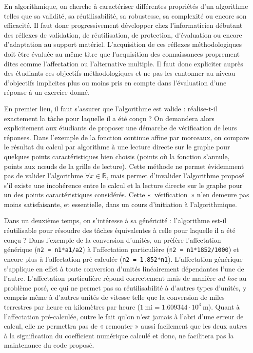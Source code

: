 \documentclass[11pt,a4paper,colorlinks,breaklinks]{article}
\begin{document}
En algorithmique, on cherche à caractériser différentes propriétés d'un algorithme telles que sa validité, sa réutilisabilité, sa robustesse, sa complexité ou encore son efficacité. Il faut donc progressivement développer chez l'informaticien débutant des réflexes de validation, de réutilisation, de protection, d'évaluation ou encore d'adaptation au support matériel. L'acquisition de ces réflexes méthodologiques doit être évaluée au même titre que l'acquisition des connaissances proprement dites comme l'affectation ou l'alternative multiple. Il faut donc expliciter auprès des étudiants ces objectifs méthodologiques et ne pas les cantonner au niveau d'objectifs implicites plus ou moins pris en compte dans l'évaluation d'une réponse à un exercice donné.

En premier lieu, il faut s'assurer que l'algorithme est valide : réalise-t-il exactement la tâche pour laquelle il a été conçu ? On demandera alors explicitement aux étudiants de proposer une démarche de vérification de leurs réponses. Dans l'exemple de la fonction continue affine par morceaux, on compare le résultat du calcul par algorithme à une lecture directe sur le graphe pour quelques points caractéristiques bien choisis (points où la fonction s'annule,  
points aux n\oe uds de la grille de lecture). Cette méthode ne permet évidemment
pas de valider l'algorithme $\forall x \in \mathbb{R}$, mais permet d'invalider
l'algorithme proposé s'il existe une incohérence entre le calcul et la lecture
directe sur le graphe pour un des points caractéristiques considérés.
Cette «~vérification~» n'en demeure pas moins satisfaisante, et essentielle, 
dans un cours d'initiation à l'algorithmique.

Dans un deuxième temps, on s'intéresse à sa généricité : l'algorithme est-il réutilisable pour résoudre des tâches équivalentes à celle pour laquelle il a été conçu ? Dans l'exemple de la conversion d'unités, on préfère l'affectation générique (\texttt{n2 = n1*a1/a2}) à l'affectation particulière (\texttt{n2 = n1*1852/1000}) et encore plus à l'affectation pré-calculée (\texttt{n2 = 1.852*n1}). L'affectation générique s'applique en effet à toute conversion d'unités linéairement dépendantes l'une de l'autre. L'affectation particulière répond correctement mais de manière \emph{ad hoc} au problème posé, ce qui ne permet pas sa réutilisabilité à d'autres types d'unités, y compris même à d'autres unités de vitesse telle que la conversion de miles terrestres par heure en kilomètres par heure  ($1\ \mbox{mi} = 1.609344\cdot 10^3\ \mbox{m}$). Quant à l'affectation pré-calculée, outre le fait qu'on n'est jamais à l'abri d'une erreur de calcul, elle ne permettra pas de « remonter » aussi facilement que les deux autres à la signification du coefficient numérique calculé et donc, ne facilitera pas la maintenance du code proposé.
\end{document}
